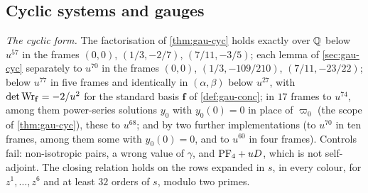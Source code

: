 \subsection{Cyclic systems and gauges}
\label{sec:evi-gauge}

\emph{The cyclic form.} The factorisation of \cref{thm:gau-cyc} holds exactly over $\mathbb{Q}$ below $u^{57}$ in the frames $(0,0)$, $(1/3,-2/7)$, $(7/11,-3/5)$; each lemma of \cref{sec:gau-cyc} separately to $u^{70}$ in the frames $(0,0)$, $(1/3,-109/210)$, $(7/11,-23/22)$; below $u^{77}$ in five frames and identically in $(\alpha,\beta)$ below $u^{27}$, with $\det\operatorname{Wr}_{\mathbf f}=-2/u^2$ for the standard basis $\mathbf f$ of \cref{def:gau-conc}; in $17$ frames to $u^{74}$, among them power-series solutions $y_0$ with $y_0(0)=0$ in place of $\varpi_0$ (the scope of \cref{thm:gau-cyc}), these to $u^{68}$; and by two further implementations (to $u^{70}$ in ten frames, among them some with $y_0(0)=0$, and to $u^{60}$ in four frames). Controls fail: non-isotropic pairs, a wrong value of $\gamma$, and $\mathrm{PF}_{4}+uD$, which is not self-adjoint. The closing relation holds on the rows expanded in $s$, in every colour, for $z^1,\dots,z^6$ and at least $32$ orders of $s$, modulo two primes.

